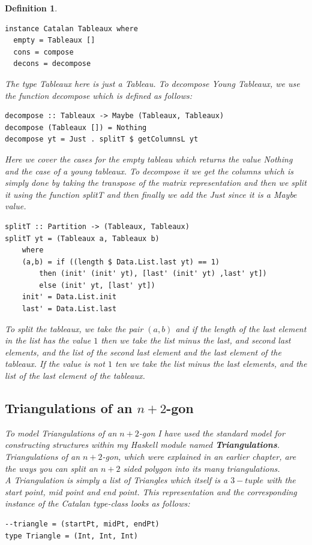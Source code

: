 \documentclass[12pt]{article}
\newtheorem{definition}{Definition}
\begin{document}
\begin{definition}
\begin{lstlisting}
instance Catalan Tableaux where
  empty = Tableaux []
  cons = compose
  decons = decompose
\end{lstlisting}
The type Tableaux here is just a Tableau. To decompose Young Tableaux, we use the function decompose which is defined as follows:
\begin{lstlisting}
decompose :: Tableaux -> Maybe (Tableaux, Tableaux)
decompose (Tableaux []) = Nothing
decompose yt = Just . splitT $ getColumnsL yt
\end{lstlisting}
Here we cover the cases for the empty tableau which returns the value {\it Nothing} and the case of a young tableaux. To decompose it we get the columns which is simply done by taking the transpose of the matrix representation and then we split it using the function {\it splitT} and then finally we add the {\it Just} since it is a {\it Maybe} value.
\begin{lstlisting}
splitT :: Partition -> (Tableaux, Tableaux)
splitT yt = (Tableaux a, Tableaux b)
	where
	(a,b) = if ((length $ Data.List.last yt) == 1)
		then (init' (init' yt), [last' (init' yt) ,last' yt])
		else (init' yt, [last' yt])	
	init' = Data.List.init
	last' = Data.List.last
\end{lstlisting}
To split the tableaux, we take the pair $(a, b)$ and if the length of the last element in the list has the value $1$ then we take the list minus the last, and second last elements, and the list of the second last element and the last element of the tableaux. If the value is not $1$ ten we take the list minus the last elements, and the list of the last element of the tableaux.

\subsection{Triangulations of an $n+2$-gon}
To model Triangulations of an $n+2$-gon I have used the standard model for constructing structures within my Haskell module named {\bf Triangulations}.\\
Triangulations of an $n+2$-gon, which were explained in an earlier chapter, are the ways you can split an $n+2$ sided polygon into its many triangulations.\\
A Triangulation is simply a list of Triangles which itself is a $3-tuple$ with the start point, mid point and end point. This representation and the corresponding instance of the Catalan type-class looks as follows:
\begin{lstlisting}
--triangle = (startPt, midPt, endPt)
type Triangle = (Int, Int, Int)


\end{lstlisting}
\end{definition}
\end{document}
